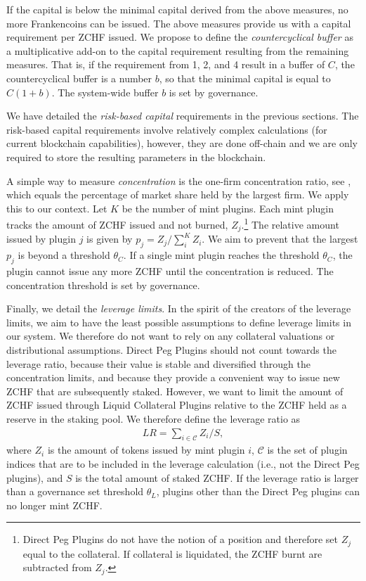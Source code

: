 \documentclass[english,11pt]{article}
\begin{document}
If the capital is below the minimal capital derived from the above measures,
no more Frankencoins can be issued.
The above measures provide us with a capital requirement per ZCHF issued.
We propose to define the \emph{countercyclical buffer} as a multiplicative add-on to the
capital requirement resulting from the remaining measures. That is,
if the requirement from 1, 2, and 4 result in a buffer of $C$, the
countercyclical buffer is a number $b$, so that the minimal capital is equal
to $C(1+b)$. The system-wide buffer $b$ is set by governance.

We have detailed the \emph{risk-based capital} requirements in the previous sections.
The risk-based capital requirements involve relatively complex calculations
(for current blockchain capabilities), however, they are done off-chain and we are only required to store the resulting
parameters in the blockchain.

A simple way to measure \emph{concentration} is the one-firm concentration ratio,
see \cite{curry1983industrial}, which equals the percentage of market share held by the largest firm. We apply this to our context. Let $K$ be the number of mint plugins. Each mint plugin tracks the amount of ZCHF issued and not burned, $Z_j$.\footnote{Direct Peg Plugins
do not have the notion of a position and therefore set $Z_j$ equal to the
collateral. If collateral is liquidated, the ZCHF burnt are subtracted from
$Z_j$.}
The relative amount issued by plugin $j$ is given by $p_j=Z_j/\sum_i^K Z_i$. We aim to prevent that the largest
$p_j$ is beyond a threshold $\theta_C$. If a single mint plugin reaches the threshold 
$\theta_C$,
the plugin cannot issue any more ZCHF until the concentration is reduced. The
concentration threshold is set by governance.

Finally, we detail the \emph{leverage limits}. In the spirit of the
creators of the leverage limits, we aim to have the least possible assumptions
to define leverage limits in our system. We therefore do not want to rely on any 
collateral valuations or distributional assumptions.
Direct Peg Plugins should not count towards the leverage ratio,
because their value is stable and diversified through the concentration limits,
and because they provide a convenient way to issue new 
ZCHF that are subsequently staked. However, we want to limit the
amount of ZCHF issued through Liquid Collateral Plugins relative to the ZCHF
held as a reserve in the staking pool. We therefore define the leverage ratio
as
\begin{align}
LR = \sum_{i \in \mathcal{C}} Z_i/S,
\end{align}
where $Z_i$ is the amount of tokens issued by mint plugin $i$, $\mathcal{C}$
is the set of plugin indices that are to be included in the leverage
calculation (i.e., not the Direct Peg plugins), and $S$ is the total amount
of staked ZCHF. If the leverage ratio is larger than a governance set threshold $\theta_L$,
plugins other than the Direct Peg plugins can no longer mint ZCHF.
\end{document}
